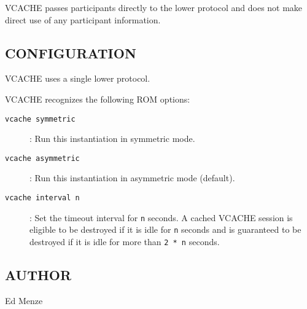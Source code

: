 VCACHE passes participants directly to the lower protocol and does not
make direct use of any participant information.



\subsection*{CONFIGURATION}

VCACHE uses a single lower protocol.

\noindent
VCACHE recognizes the following ROM options:

\begin{description}

\item[{\tt vcache symmetric}]:
\smallskip
Run this instantiation in symmetric mode.

\item[{\tt vcache asymmetric}]:
Run this instantiation in asymmetric mode (default).

\item[{\tt vcache interval n}]:
Set the timeout interval for {\tt n} seconds.  A cached VCACHE session
is eligible to be destroyed if it is idle for {\tt n} seconds and is
guaranteed to be destroyed if it is idle for more than {\tt 2 * n}
seconds. 

\end{description}

\subsection*{AUTHOR}

\noindent Ed Menze

